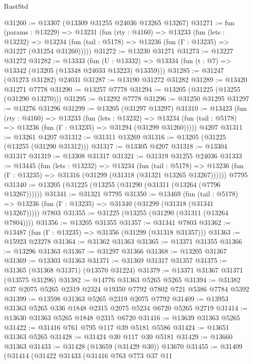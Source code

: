 \begin{lexlean}{RustStd}
\begin{coremodule}
@31260 := @13307 (@13309 @31255 @24036 @13265 @13267)
@31271 := fun (params : @13229) =>
  @13231
    (fun (rty : @4160) =>
    @13233
      (fun (lets : @13232) =>
      @13234 (fun (tail : @5178) => @13236 (fun (Γ : @13235) => @31227 (@31254 @31260)))))
@31272 := @13230 @31271
@31273 := @13227 @31272
@31282 := @13333
    (fun (U : @13332) => @13334 (fun (t : @7) => @13342 (@13205 (@13348 @24033 @13223) @13359)))
@31285 := @31247 (@31273 @31282) @24031
@31287 := @13190 @31272 @31282
@31289 := @13420 @31271 @7778
@31290 := @13257 @7778
@31294 := @13205 (@31225 (@13255 (@31290 @13270)))
@31295 := @13292 @7778
@31296 := @31250 @31295
@31297 := @13276 @31296
@31299 := @13205 (@31297 @13297)
@31310 := @13423
    (fun (rty : @4160) =>
    @13233
      (fun (lets : @13232) =>
      @13234 (fun (tail : @5178) => @13236 (fun (Γ : @13235) => @31294 (@31299 @31260)))))
    @4207
@31311 := @13261 @4207
@31312 := @31311 @13269
@31316 := @13205 (@31225 (@13255 (@31290 @31312)))
@31317 := @13305 @4207
@31318 := @13304 @31317
@31319 := @13308 @31317
@31321 := @31319 @31255 @24036
@31333 := @13445
    (fun (lets : @13232) =>
    @13234
      (fun (tail : @5178) =>
      @13236 (fun (Γ : @13235) => @31316 (@31299 (@31318 (@31321 @13265 @13267))))))
    @7795
@31340 := @13205 (@31225 (@13255 (@31290 (@31311 (@13264 (@7796 @13267))))))
@31341 := @31321 @7795
@31350 := @13469
    (fun (tail : @5178) => @13236 (fun (Γ : @13235) => @31340 (@31299 (@31318 (@31341 @13267)))))
    @7803
@31355 := @31225 (@13255 (@31290 (@31311 (@13264 @7804))))
@31356 := @13205 @31355
@31357 := @31341 @7803
@31362 := @13487 (fun (Γ : @13235) => @31356 (@31299 (@31318 @31357)))
@31363 := @15923 @23278
@31364 := @31362 @31363
@31365 := @13371 @31355
@31366 := @13296 @31363
@31367 := @31297 @31366
@31368 := @13205 @31367
@31369 := @13303 @31363
@31371 := @31369 @31317 @31357
@31375 := @31365 (@31368 @31371) (@13570 @31224)
@31379 := @13371 @31367 @31371 (@13575 @31296)
@31382 := @14776 @31363 @5265 @5265
@31394 := @31382 @37 @2075 @5265 @2319 @2324 @19350 @7792 @7802 @721 @5386 @7784 @5392
@31399 := @13598 @31363 @5265 @2319 @2075 @7792
@31409 := @13953 @31363 @5265 @336 @1848 @2315 @2075 @5234 @6720 @5265 @2719
@31414 := @13630 @31363 @5265 @1848 @2315 @6720
@31416 := @13639 @31363 @5265
@31422 := @31416 @761 @795 @117 @39 @5181 @5586
@31424 := @13651 @31363 @5265
@31428 := @31424 @30 @117 @30 @5181
@31429 := @13660 @31363
@31433 := @31428 (@13659 (@31429 @30)) @13670
@31455 := @31409
    (@31414
      (@31422
        @31433
        (@31416
          @763
          @773
          @37
          @11

\end{coremodule}
\end{lexlean}
